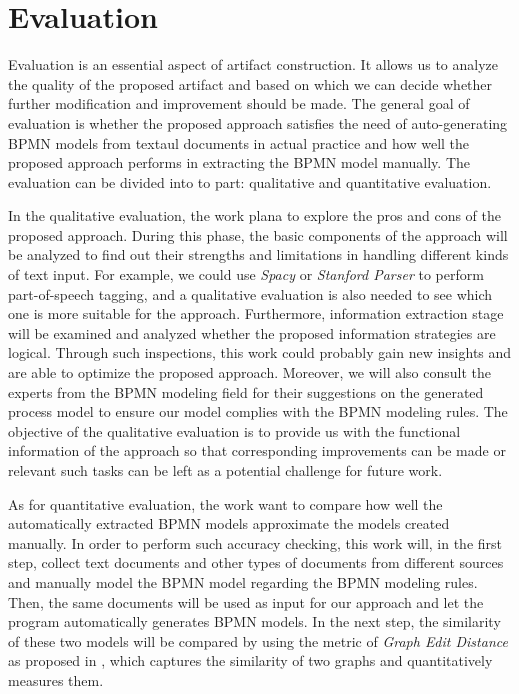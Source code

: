 \chapter{Evaluation}

Evaluation is an essential aspect of artifact construction. It allows us to analyze the quality of the proposed artifact and based on which we can decide whether further modification and improvement should be made. The general goal of evaluation is whether the proposed approach satisfies the need of auto-generating BPMN models from textaul documents in actual practice and how well the proposed approach performs in extracting the BPMN model manually. The evaluation can be divided into to part: qualitative and quantitative evaluation. 

In the qualitative evaluation, the work plana to explore the pros and cons of the proposed approach. During this phase, the basic components of the approach will be analyzed to find out their strengths and limitations in handling different kinds of text input. For example, we could use \textit{Spacy} or \textit{Stanford Parser} to perform part-of-speech tagging, and a qualitative evaluation is also needed to see which one is more suitable for the approach. Furthermore, information extraction stage will be examined and analyzed whether the proposed information strategies are logical. Through such inspections, this work could probably gain new insights and are able to optimize the proposed approach. Moreover, we will also consult the experts from the BPMN modeling field for their suggestions on the generated process model to ensure our model complies with the BPMN modeling rules. The objective of the qualitative evaluation is to provide us with the functional information of the approach so that corresponding improvements can be made or relevant such tasks can be left as a potential challenge for future work.

As for quantitative evaluation, the work want to compare how well the automatically extracted BPMN models approximate the models created manually. In order to perform such accuracy checking, this work will, in the first step, collect text documents and other types of documents from different sources and manually model the BPMN model regarding the BPMN modeling rules. Then, the same documents will be used as input for our approach and let the program automatically generates BPMN models. In the next step, the similarity of these two models will be compared by using the metric of \textit{Graph Edit Distance} as proposed in \cite{t2m_1}, which captures the similarity of two graphs and quantitatively measures them.

